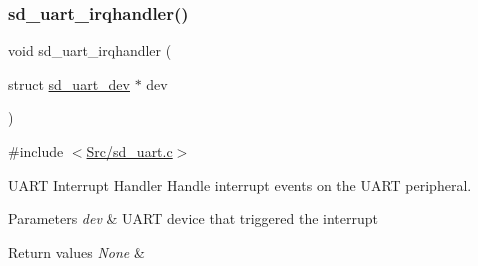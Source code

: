 \subsubsection{\texorpdfstring{sd\+\_\+uart\+\_\+irqhandler()}{sd\_uart\_irqhandler()}}
{\footnotesize\ttfamily void sd\+\_\+uart\+\_\+irqhandler (\begin{DoxyParamCaption}\item[{struct \mbox{\hyperlink{structsd__uart__dev}{sd\+\_\+uart\+\_\+dev}} $\ast$}]{dev }\end{DoxyParamCaption})}



{\ttfamily \#include $<$\mbox{\hyperlink{sd__uart_8c}{Src/sd\+\_\+uart.\+c}}$>$}



U\+A\+RT Interrupt Handler Handle interrupt events on the U\+A\+RT peripheral. 


\begin{DoxyParams}{Parameters}
{\em dev} & U\+A\+RT device that triggered the interrupt \\
\hline
\end{DoxyParams}

\begin{DoxyRetVals}{Return values}
{\em None} & \\
\hline
\end{DoxyRetVals}

